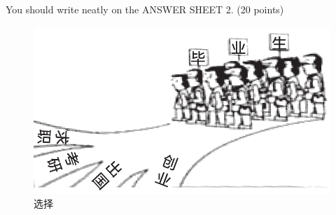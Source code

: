You should write neatly on the ANSWER SHEET 2. (20 points)


\begin{figure}[h!]
	\centering
	\includegraphics[width=0.56\linewidth]{picture/2013.png}
	\caption*{选择}
\end{figure}

\checkpagenumber